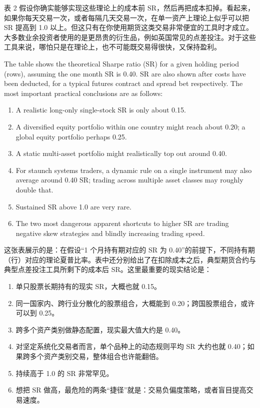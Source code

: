 \begin{chineseblock}表 2 假设你确实能够实现这些理论上的成本前 SR，然后再把成本扣掉。看起来，如果你每天交易一次，或者每隔几天交易一次，在单一资产上理论上似乎可以把 SR 提高到 1.0 以上。但这只有在你使用期货这类交易非常便宜的工具时才成立。大多数业余投资者使用的是更昂贵的衍生品，例如英国常见的点差投注。对于这些工具来说，哪怕只是在理论上，也不可能既交易得很快，又保持盈利。\end{chineseblock}

\bipairgap

\begin{englishblock} The table shows the theoretical Sharpe ratio (SR) for a given holding period (rows), assuming the one month SR is 0.40. SR are also shown after costs have been deducted, for a typical futures contract and spread bet respectively. The most important practical conclusions are as follows: \end{englishblock}

\begin{enumerate}
\item A realistic long-only single-stock SR is only about 0.15.
\item A diversified equity portfolio within one country might reach about 0.20; a global equity portfolio perhaps 0.25.
\item A static multi-asset portfolio might realistically top out around 0.40.
\item For staunch systems traders, a dynamic rule on a single instrument may also average around 0.40 SR; trading across multiple asset classes may roughly double that.
\item Sustained SR above 1.0 are very rare.
\item The two most dangerous apparent shortcuts to higher SR are trading negative skew strategies and blindly increasing trading speed. \end{enumerate}

\begin{chineseblock}这张表展示的是：在假设“1 个月持有期对应的 SR 为 0.40”的前提下，不同持有期（行）对应的理论夏普比率。表中还分别给出了在扣除成本之后，典型期货合约与典型点差投注工具所剩下的成本后 SR。这里最重要的现实结论是：\end{chineseblock}

\begin{enumerate}
\item 单只股票长期持有的现实 SR，大概也就 0.15。
\item 同一国家内、跨行业分散化的股票组合，大概能到 0.20；跨国股票组合，或许可以到 0.25。
\item 跨多个资产类别做静态配置，现实最大值大约是 0.40。
\item 对坚定系统化交易者而言，单个品种上的动态规则平均 SR 大约也就 0.40；如果跨多个资产类别交易，整体组合也许能翻倍。
\item 持续高于 1.0 的 SR 非常罕见。
\item 想把 SR 做高，最危险的两条“捷径”就是：交易负偏度策略，或者盲目提高交易速度。\end{enumerate}

